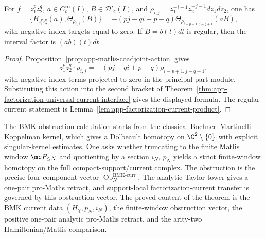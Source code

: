\begin{cor}
\label{cor:app-factorization-principal-part-current-brackets}
\label{prop:app-factorization-principal-part-bracket}
  For \(f=z_1^p z_2^q\), \(a\in C^\infty_c(I)\),
  \(B\in\mathcal D'_c(I)\), and
  \(\rho_{i,j}=z_1^{-i-1}z_2^{-j-1}dz_1dz_2\), one has
  \[
    \{B_{z_1^p z_2^q}(a),\Theta_{\rho_{i,j}}(B)\}
      =
      -(pj-qi+p-q)
      \Theta_{\rho_{i-p+1,j-q+1}}(aB),
  \]
  with negative-index targets equal to zero.  If \(B=b(t)dt\) is
  regular, then the interval factor is \((ab)(t)dt\).
\end{cor}

\begin{proof}
  Proposition~\ref{prop:app-matlis-coadjoint-action} gives
  \[
    z_1^p z_2^q\cdot\rho_{i,j}
      =-(pj-qi+p-q)\rho_{i-p+1,j-q+1},
  \]
  with negative-index terms projected to zero in the principal-part
  module.  Substituting this action into the second bracket of
  Theorem~\ref{thm:app-factorization-universal-current-interface} gives
  the displayed formula.  The regular-current statement is
  Lemma~\ref{lem:app-factorization-current-product}.
\end{proof}

\medskip
The BMK obstruction calculation starts from the classical
Bochner--Martinelli--Koppelman kernel, which gives a Dolbeault homotopy
on \(\C^2\setminus\{0\}\) with explicit singular-kernel estimates.  One asks
whether truncating to the finite Matlis window
\(\mc P_{\leq N}\) and quotienting by a section
\(i_N\), \(p_N\) yields a strict finite-window homotopy on the
full compact-support/current complex.  The obstruction is the precise
four-component vector \(\operatorname{Ob}^{\mathrm{BMK}\text{-}\mathrm{curr}}_N\).
The analytic Taylor tower gives a one-pair pro-Matlis retract, and
support-local factorization-current transfer is governed by this
obstruction vector.  The proved content of
the theorem is the BMK current data
\((H_\chi,p_N,i_N)\), the finite-window obstruction vector, the
positive one-pair analytic pro-Matlis retract, and the arity-two
Hamiltonian/Matlis comparison.

